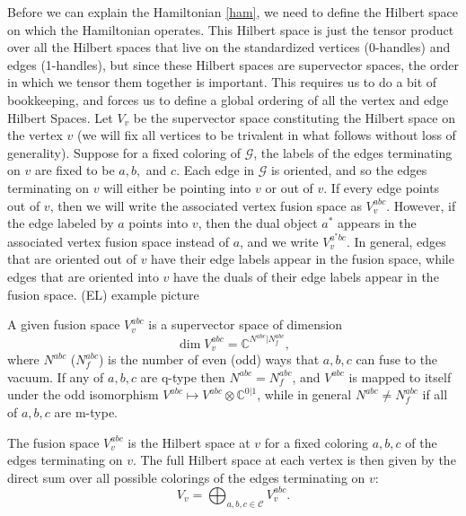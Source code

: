 \documentclass[12pt,a4paper]{article}
\newcommand{\tp}{\otimes}
\newcommand{\cc}{\mathbb{C}}
\newcommand{\mcg}{\mathcal{G}}
\newcommand{\mcc}{\mathcal{C}}
\newcommand\be            {\begin{equation}}
\newcommand\ee            {\end{equation}}
\newcommand{\ethan}[1]{{\color{amethyst}\footnotesize{(EL) #1}}}
\begin{document}
Before we can explain the Hamiltonian \eqref{ham}, we need to define the Hilbert space on which the Hamiltonian operates. 
This Hilbert space is just the tensor product over all the Hilbert spaces that live on the standardized vertices (0-handles) and edges (1-handles), but since these Hilbert spaces are supervector spaces, the order in which we tensor them together is important.
This requires us to do a bit of bookkeeping, and forces us to define a global ordering of all the vertex and edge Hilbert Spaces.
Let $V_{v}$ be the supervector space constituting the Hilbert space on the vertex $v$ (we will fix all vertices to be trivalent in what follows without loss of generality).
Suppose for a fixed coloring of $\mcg$, the labels of the edges terminating on $v$ are fixed to be $a,b,$ and $c$.
Each edge in $\mcg$ is oriented, and so the edges terminating on $v$ will either be pointing into $v$ or out of $v$. 
If every edge points out of $v$, then we will write the associated vertex fusion space as $V^{abc}_v$.
However, if the edge labeled by $a$ points into $v$, then the dual object $a^*$ appears in the associated vertex fusion space instead of $a$, and we write $V^{a^*bc}_v$. 
In general, edges that are oriented out of $v$ have their edge labels appear in the fusion space, while edges that are oriented into $v$ have the duals of their edge labels appear in the fusion space. \ethan{example picture}

A given fusion space $V^{abc}_v$ is a supervector space of dimension 
\be \dim V^{abc}_v = \cc^{N^{abc}|N^{abc}_f},\ee
where $N^{abc}$ ($N^{abc}_f$) is the number of even (odd) ways that $a,b,c$ can fuse to the vacuum.
If any of $a,b,c$ are q-type then $N^{abc} = N_f^{abc}$, and $V^{abc}$ is mapped to itself under the odd isomorphism $V^{abc} \mapsto V^{abc} \tp \cc^{0|1}$, while in general $N^{abc}\neq N^{abc}_f$ if all of $a,b,c$ are m-type. 

The fusion space $V^{abc}_v$ is the Hilbert space at $v$ for a fixed coloring $a,b,c$ of the edges terminating on $v$. 
The full Hilbert space at each vertex is then given by the direct sum over all possible colorings of the edges terminating on $v$:
\be V_v = \bigoplus_{a,b,c \in \mcc} V^{abc}_v.\ee
\end{document}
